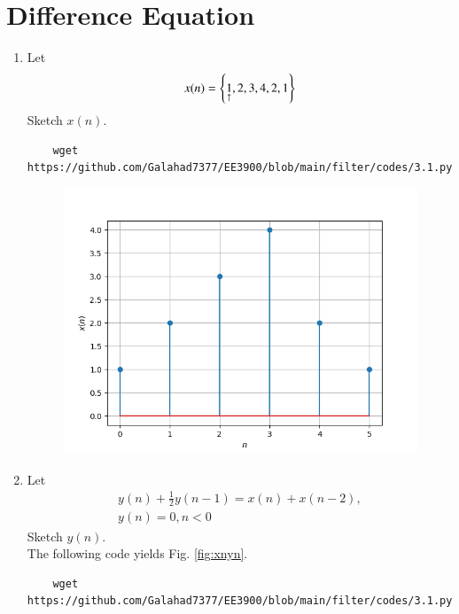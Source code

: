 \documentclass[journal,12pt,twocolumn]{IEEEtran}
\renewcommand\thesection{\arabic{section}}
\begin{document}
\section{Difference Equation}
\begin{enumerate}[label=\thesection.\arabic*,ref=\thesection.\theenumi]
\item Let
	\label{def:xn}
\begin{equation}
x(n) = \left\{\underset{\uparrow}{1},2,3,4,2,1\right\}
\end{equation}
Sketch $x(n)$.

\solution
\begin{lstlisting}
    wget https://github.com/Galahad7377/EE3900/blob/main/filter/codes/3.1.py
\end{lstlisting}
\begin{figure}[!ht]
\begin{center}
\includegraphics[width=\columnwidth]{figs/3.1.png}
\end{center}
\label{fig:xn}	
\end{figure}
\item Let
\begin{multline}
\label{eq:iir_filter}
y(n) + \frac{1}{2}y(n-1) = x(n) + x(n-2), 
\\
 y(n) = 0, n < 0
\end{multline}
Sketch $y(n)$.  
\\
\solution The following code yields Fig. \ref{fig:xnyn}.
\begin{lstlisting}
    wget https://github.com/Galahad7377/EE3900/blob/main/filter/codes/3.1.py
\end{lstlisting}

\end{enumerate}
\end{document}
